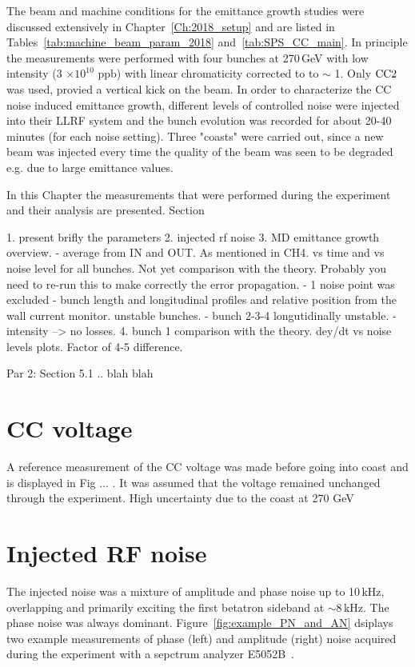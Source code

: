 \vspace*{-1mm}
The beam and machine conditions for the emittance growth studies were discussed extensively in Chapter~\ref{Ch:2018_setup} and are listed in Tables~\ref{tab:machine_beam_param_2018} and~\ref{tab:SPS_CC_main}. In principle the measurements were performed with four bunches at 270\,GeV with low intensity (3 $\times \mathrm{10^{10}}$ ppb) with linear chromaticity corrected to to $\sim$ 1. Only ${\mathrm{CC}}2$ was used, provied a vertical kick on the beam. In order to characterize the CC noise induced emittance growth, different levels of controlled noise were injected into their LLRF system and the bunch evolution was recorded for about 20-40 minutes (for each noise setting). Three "coasts" were carried out, since a new beam was injected every time the quality of the beam was seen to be degraded e.g. due to large emittance values. 

In this Chapter the measurements that were performed during the experiment and their analysis are presented. Section 


1. present brifly the parameters
2. injected rf noise
3. MD emittance growth overview. 
    - average from IN and OUT. As mentioned in CH4. vs time and vs noise level for all bunches. Not yet comparison with the theory. Probably you need to re-run this to make correctly the error propagation. 
    - 1 noise point was excluded
    - bunch length and longitudinal profiles and relative position from the wall current monitor.  unstable bunches.
    - bunch 2-3-4 longutidinally unstable.
    - intensity --> no losses.
4. bunch 1 comparison with the theory. dey/dt vs noise levels plots. Factor of 4-5 difference. 

Par 2: Section 5.1 .. blah blah

\section{CC voltage}\label{sec:CC_voltage_meas2018}
A reference measurement of the CC voltage was made before going into coast and is displayed in Fig ... . It was assumed that the voltage remained unchanged through the experiment. High uncertainty due to the coast at 270 GeV

\section{Injected RF noise}\label{sec:noisemeas2018}
\begin{sloppypar} %
 The injected noise was a mixture of amplitude and phase noise up to 10\,kHz, overlapping and primarily exciting the first betatron sideband at $\sim 8$\,kHz. The phase noise was always dominant. Figure~\ref{fig:example_PN_and_AN} dsiplays two example measurements of phase (left) and amplitude (right) noise acquired during the experiment with a sepctrum analyzer E5052B~\cite{E5052B_insight}. 
\end{sloppypar} 

